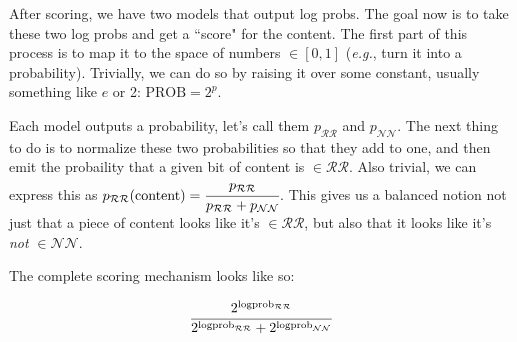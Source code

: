 \documentclass[11pt]{article}
\begin{document}
After scoring, we have two models that output log probs. The goal now is to take these two log probs and get a ``score" for the content. The first part of this process is to map it to the space of numbers $\in [0,1]$ (\textit{e.g.}, turn it into a probability). Trivially, we can do so by raising it over some constant, usually something like $e$ or 2: $\text{PROB} = 2^p$.

Each model outputs a probability, let's call them $p_{\mathcal{RR}}$ and $p_{\mathcal{NN}}$. The next thing to do is to normalize these two probabilities so that they add to one, and then emit the probaility that a given bit of content is $\in \mathcal{RR}$. Also trivial, we can express this as $p_{\mathcal{RR}}(\text{content}) = \cfrac{p_{\mathcal{RR}}}{p_{\mathcal{RR}} + p_{\mathcal{NN}}}$. This gives us a balanced notion not just that a piece of content looks like it's $\in \mathcal{RR}$, but also that it looks like it's \textit{not} $\in \mathcal{NN}$.

The complete scoring mechanism looks like so:

\begin{equation}
\cfrac{2^{\text{logprob}{_{\mathcal{RR}}}}}{2^{\text{logprob}_{\mathcal{RR}}} + 2^{\text{logprob}_{\mathcal{NN}}}}
\end{equation}
\end{document}
